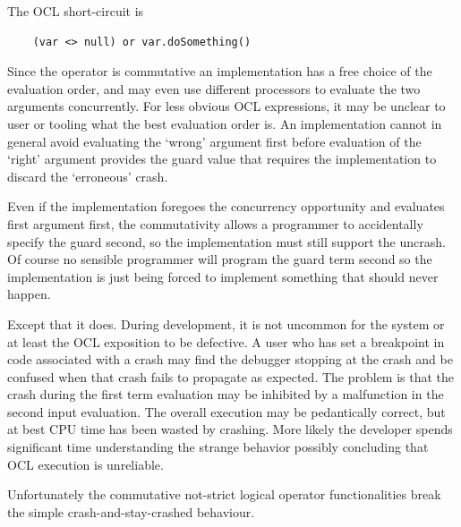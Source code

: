 \documentclass{llncs}
\begin{document}
The OCL short-circuit is

\begin{verbatim}
	(var <> null) or var.doSomething()
\end{verbatim}

Since the operator is commutative an implementation has a free choice of the evaluation order, and may even use different processors to evaluate the two arguments concurrently. For less obvious OCL expressions, it may be unclear to user or tooling what the best evaluation order is. An implementation cannot in general avoid evaluating the `wrong' argument first before evaluation of the `right' argument provides the guard value that requires the implementation to discard the `erroneous' crash.

Even if the implementation foregoes the concurrency opportunity and evaluates first argument first, the commutativity allows a programmer to accidentally specify the guard second, so the implementation must still support the uncrash. Of course no sensible programmer will program the guard term second so the implementation is just being forced to implement something that should never happen.

Except that it does. During development, it is not uncommon for the system or at least the OCL exposition to be defective. A user who has set a breakpoint in code associated with a crash may find the debugger stopping at the crash and be confused when that crash fails to propagate as expected. The problem is that  the crash during the first term evaluation may be inhibited by a malfunction in the second input evaluation. The overall execution may be pedantically correct, but at best CPU time has been wasted by crashing. More likely the developer spends significant time understanding the strange behavior possibly concluding that OCL execution is unreliable.



Unfortunately the commutative not-strict logical operator functionalities break the simple crash-and-stay-crashed behaviour.
\end{document}
